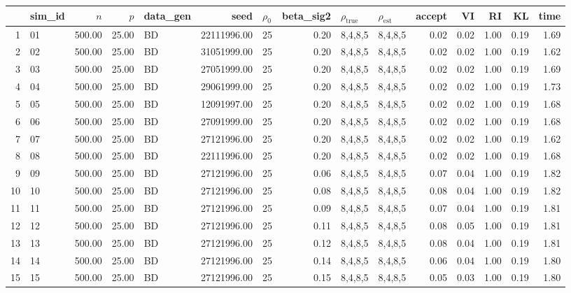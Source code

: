 \begin{table}[ht]
\centering
\begin{tabular}{rlrrlrlrllrrrrr}
  \hline
 & sim\_id & $n$ & $p$ & data\_gen & seed & $\rho_0$ & beta\_sig2 & $\rho_{\text{true}}$ & $\rho_{\text{est}}$ & accept & VI & RI & KL & time \\ 
  \hline
1 & 01 & 500.00 & 25.00 & BD & 22111996.00 & 25 & 0.20 & 8,4,8,5 & 8,4,8,5 & 0.02 & 0.02 & 1.00 & 0.19 & 1.69 \\ 
  2 & 02 & 500.00 & 25.00 & BD & 31051999.00 & 25 & 0.20 & 8,4,8,5 & 8,4,8,5 & 0.02 & 0.02 & 1.00 & 0.19 & 1.62 \\ 
  3 & 03 & 500.00 & 25.00 & BD & 27051999.00 & 25 & 0.20 & 8,4,8,5 & 8,4,8,5 & 0.02 & 0.02 & 1.00 & 0.19 & 1.69 \\ 
  4 & 04 & 500.00 & 25.00 & BD & 29061999.00 & 25 & 0.20 & 8,4,8,5 & 8,4,8,5 & 0.02 & 0.02 & 1.00 & 0.19 & 1.73 \\ 
  5 & 05 & 500.00 & 25.00 & BD & 12091997.00 & 25 & 0.20 & 8,4,8,5 & 8,4,8,5 & 0.02 & 0.02 & 1.00 & 0.19 & 1.68 \\ 
  6 & 06 & 500.00 & 25.00 & BD & 27091999.00 & 25 & 0.20 & 8,4,8,5 & 8,4,8,5 & 0.02 & 0.02 & 1.00 & 0.19 & 1.68 \\ 
  7 & 07 & 500.00 & 25.00 & BD & 27121996.00 & 25 & 0.20 & 8,4,8,5 & 8,4,8,5 & 0.02 & 0.02 & 1.00 & 0.19 & 1.62 \\ 
  8 & 08 & 500.00 & 25.00 & BD & 22111996.00 & 25 & 0.20 & 8,4,8,5 & 8,4,8,5 & 0.02 & 0.02 & 1.00 & 0.19 & 1.68 \\ 
  9 & 09 & 500.00 & 25.00 & BD & 27121996.00 & 25 & 0.06 & 8,4,8,5 & 8,4,8,5 & 0.07 & 0.04 & 1.00 & 0.19 & 1.82 \\ 
  10 & 10 & 500.00 & 25.00 & BD & 27121996.00 & 25 & 0.08 & 8,4,8,5 & 8,4,8,5 & 0.08 & 0.04 & 1.00 & 0.19 & 1.82 \\ 
  11 & 11 & 500.00 & 25.00 & BD & 27121996.00 & 25 & 0.09 & 8,4,8,5 & 8,4,8,5 & 0.07 & 0.04 & 1.00 & 0.19 & 1.81 \\ 
  12 & 12 & 500.00 & 25.00 & BD & 27121996.00 & 25 & 0.11 & 8,4,8,5 & 8,4,8,5 & 0.08 & 0.05 & 1.00 & 0.19 & 1.81 \\ 
  13 & 13 & 500.00 & 25.00 & BD & 27121996.00 & 25 & 0.12 & 8,4,8,5 & 8,4,8,5 & 0.08 & 0.04 & 1.00 & 0.19 & 1.81 \\ 
  14 & 14 & 500.00 & 25.00 & BD & 27121996.00 & 25 & 0.14 & 8,4,8,5 & 8,4,8,5 & 0.06 & 0.04 & 1.00 & 0.19 & 1.80 \\ 
  15 & 15 & 500.00 & 25.00 & BD & 27121996.00 & 25 & 0.15 & 8,4,8,5 & 8,4,8,5 & 0.05 & 0.03 & 1.00 & 0.19 & 1.80 \\ 

\end{tabular}
\end{table}
